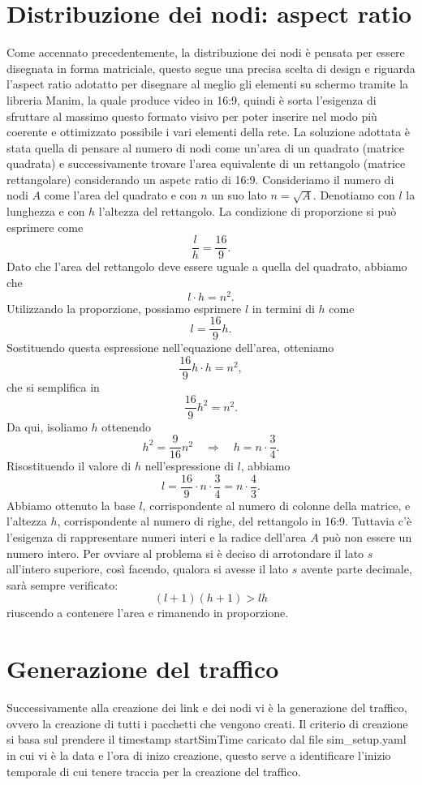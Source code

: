 \documentclass[binding=0.6cm]{sapthesis}
\begin{document}
\section{Distribuzione dei nodi: aspect ratio}
Come accennato precedentemente, la distribuzione dei nodi è pensata per essere disegnata in forma matriciale, questo segue una precisa scelta di design e riguarda
l'aspect ratio adotatto per disegnare al meglio gli elementi su schermo tramite la libreria Manim, la quale produce video in 16:9, quindi è sorta l'esigenza
di sfruttare al massimo questo formato visivo per poter inserire nel modo più coerente e ottimizzato possibile i vari elementi della rete.
La soluzione adottata è stata quella di pensare al numero di nodi come un'area di un quadrato (matrice quadrata) e successivamente trovare l'area equivalente 
di un rettangolo (matrice rettangolare) considerando un
aspetc ratio di 16:9. Consideriamo il numero di nodi \(A\) come l'area del quadrato e con \(n\) un suo lato \(n = \sqrt{A}\).
Denotiamo con $l$ la lunghezza e con $h$ l'altezza del rettangolo. La condizione di proporzione si può esprimere come
\[
\frac{l}{h} = \frac{16}{9}.
\]
Dato che l'area del rettangolo deve essere uguale a quella del quadrato, abbiamo che
\[
l \cdot h = n^2.
\]
Utilizzando la proporzione, possiamo esprimere $l$ in termini di $h$ come
\[
l = \frac{16}{9}h.
\]
Sostituendo questa espressione nell'equazione dell'area, otteniamo
\[
\frac{16}{9}h \cdot h = n^2,
\]
che si semplifica in
\[
\frac{16}{9}h^2 = n^2.
\]
Da qui, isoliamo $h$ ottenendo
\[
h^2 = \frac{9}{16}n^2 \quad \Longrightarrow \quad h = n \cdot \frac{3}{4}.
\]
Risostituendo il valore di $h$ nell'espressione di $l$, abbiamo
\[
l = \frac{16}{9} \cdot n \cdot \frac{3}{4} = n \cdot \frac{4}{3}.
\]
Abbiamo ottenuto la base \(l\), corrispondente al numero di colonne della matrice, e l'altezza \(h\), corrispondente al numero
di righe, del rettangolo in 16:9. Tuttavia c'è l'esigenza di rappresentare numeri interi e la radice dell'area \(A\) può non essere un numero intero.
Per ovviare al problema si è deciso di arrotondare il lato \(s\) all'intero superiore, così facendo, qualora si avesse
il lato \(s\) avente parte decimale, sarà sempre verificato:
\begin{equation}
    (l+1)(h+1)>lh
\end{equation}
riuscendo a contenere l'area e rimanendo in proporzione.

\section{Generazione del traffico}
Successivamente alla creazione dei link e dei nodi vi è la generazione del traffico, ovvero la creazione di tutti i pacchetti che vengono
creati. Il criterio di creazione si basa sul prendere il timestamp startSimTime caricato dal file sim\_setup.yaml in cui vi è la data e l'ora di inizo creazione, questo
serve a identificare l'inizio temporale di cui tenere traccia per la creazione del traffico.
\end{document}
